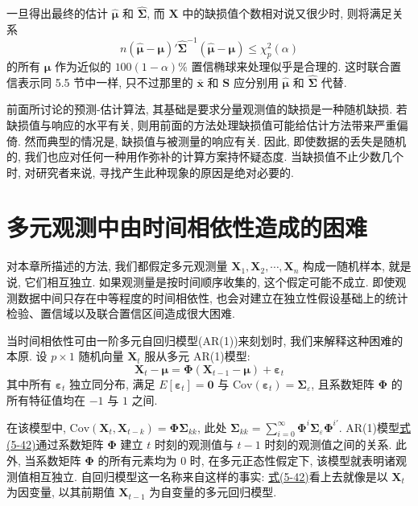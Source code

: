 一旦得出最终的估计 $\hat{\boldsymbol{\mu}}$ 和 $\hat{\boldsymbol{\Sigma}}$, 而 $\mathbf{X}$ 中的缺损值个数相对说又很少时, 则将满足关系
\label{eq:5-41}
\begin{equation}
n(\hat{\boldsymbol{\mu}}-\boldsymbol{\mu})'\hat{\boldsymbol{\Sigma}}^{-1}(\hat{\boldsymbol{\mu}}-\boldsymbol{\mu})\le\chi_p^2(\alpha) \tag{5-41}
\end{equation}
的所有 $\boldsymbol{\mu}$ 作为近似的 $100(1-\alpha)\%$ 置信椭球来处理似乎是合理的. 这时联合置信表示同 5.5 节中一样, 只不过那里的 $\bar{\mathbf{x}}$ 和 $\mathbf{S}$ 应分别用 $\hat{\boldsymbol{\mu}}$ 和 $\hat{\boldsymbol{\Sigma}}$ 代替.

\quad 前面所讨论的预测-估计算法, 其基础是要求分量观测值的缺损是一种随机缺损. 若缺损值与响应的水平有关, 则用前面的方法处理缺损值可能给估计方法带来严重偏倚. 然而典型的情况是, 缺损值与被测量的响应有关. 因此, 即使数据的丢失是随机的, 我们也应对任何一种用作弥补的计算方案持怀疑态度. 当缺损值不止少数几个时, 对研究者来说, 寻找产生此种现象的原因是绝对必要的.

\section{多元观测中由时间相依性造成的困难}
\label{sec:5.8}

对本章所描述的方法, 我们都假定多元观测量 $\mathbf{X}_1,\mathbf{X}_2,\cdots,\mathbf{X}_n$ 构成一随机样本, 就是说, 它们相互独立. 如果观测量是按时间顺序收集的, 这个假定可能不成立. 即使观测数据中间只存在中等程度的时间相依性, 也会对建立在独立性假设基础上的统计检验、置信域以及联合置信区间造成很大困难.

当时间相依性可由一阶多元自回归模型(AR(1))来刻划时, 我们来解释这种困难的本原. 设 $p\times1$ 随机向量 $\mathbf{X}_t$ 服从多元 AR(1)模型:
\label{eq:5-42}
\begin{equation}
\mathbf{X}_t-\boldsymbol{\mu}=\boldsymbol{\Phi}(\mathbf{X}_{t-1}-\boldsymbol{\mu})+\boldsymbol{\varepsilon}_t \tag{5-42}
\end{equation}
其中所有 $\boldsymbol{\varepsilon}_t$ 独立同分布, 满足 $E[\boldsymbol{\varepsilon}_t]=\mathbf{0}$ 与 $\mathrm{Cov}(\boldsymbol{\varepsilon}_t)=\boldsymbol{\Sigma}_{\varepsilon}$, 且系数矩阵 $\boldsymbol{\Phi}$ 的所有特征值均在 $-1$ 与 $1$ 之间.

在该模型中, $\mathrm{Cov}(\mathbf{X}_t,\mathbf{X}_{t-k})=\boldsymbol{\Phi}\boldsymbol{\Sigma}_{kk}$, 此处 $\boldsymbol{\Sigma}_{kk}=\sum_{i=0}^{\infty}\boldsymbol{\Phi}^i\boldsymbol{\Sigma}_{\varepsilon}\boldsymbol{\Phi}^{i'}$. AR(1)模型\hyperref[eq:5-42]{式(5-42)}通过系数矩阵 $\boldsymbol{\Phi}$ 建立 $t$ 时刻的观测值与 $t-1$ 时刻的观测值之间的关系. 此外, 当系数矩阵 $\boldsymbol{\Phi}$ 的所有元素均为 0 时, 在多元正态性假定下, 该模型就表明诸观测值相互独立. 自回归模型这一名称来自这样的事实: \hyperref[eq:5-42]{式(5-42)}看上去就像是以 $\mathbf{X}_t$ 为因变量, 以其前期值 $\mathbf{X}_{t-1}$ 为自变量的多元回归模型.

